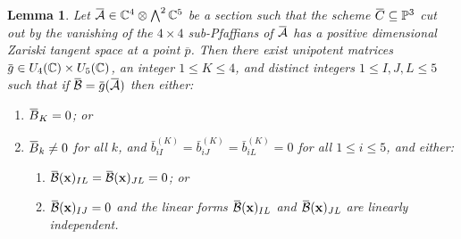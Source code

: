 \documentclass[11pt]{amsart}
\numberwithin{theorem}{section}
\numberwithin{equation}{section}
\newtheorem{lemma}[theorem]{Lemma}
\theoremstyle{definition}\newtheorem{defn}[theorem]{Definition}
\theoremstyle{definition}\newtheorem{remark}[theorem]{Remark}
\theoremstyle{definition}\newtheorem{question}[theorem]{Question}
\theoremstyle{definition}\newtheorem{problem}[theorem]{Problem}
\newcommand{\CC}{\mathbb{C}}
\newcommand{\PP}{\mathbb{P}}
\newcommand{\cB}{\mathcal{B}}
\newcommand{\cA}{\mathcal{A}}
\newcommand{\overbar}[1]{\mkern 1.5mu\overline{\mkern-1.5mu#1\mkern-1.5mu}\mkern 1.5mu}
\renewcommand{\subset}{\subseteq}
\newcommand{\I}{I}
\newcommand{\J}{J}
\newcommand{\K}{K}
\renewcommand{\L}{L}
\begin{document}
\begin{lemma}
    \label{lemma:normal-form-5-CC}
       Let $\overbar{\cA} \in \CC^4 \otimes \bigwedge^2 \CC^5$ be a section such that the scheme $\overbar{C} \subset \PP^3$ cut out by the vanishing of the $4 \times 4$ sub-Pfaffians of $\overbar{\cA}$ has a positive dimensional Zariski tangent space at a point $\overline{p}$. Then there exist unipotent matrices $\overbar{g} \in U_4(\CC) \times U_5(\CC)$, an integer $1 \leq \K \leq 4$, and distinct integers $1 \leq \I,\J,\L \leq 5$ such that if $\overbar \cB = \overbar{g}(\overbar \cA)$ then either:
       \begin{enumerate}[label=(\Alph*)]
           \item \label{norm-form-CC-1} $\overbar{B}_\K = 0$; or
           \item \label{norm-form-CC-2} $\overbar{B}_{k} \neq 0$ for all $k$, and $\bar{b}_{i \I}^{(\K)} = \bar{b}_{i \J}^{(\K)} = \bar{b}_{i \L}^{(\K)} = 0$ for all $1 \leq i \leq 5$, and either:
             \begin{enumerate}[label=(\roman*)]
             \item \label{norm-form-CC-3}
               $\overbar{\mathcal{B}}(\mathbf{x})_{\I\L} = \overbar{\mathcal{B}}(\mathbf{x})_{\J\L} = 0$; or
             \item \label{norm-form-CC-4}
               $\overbar{\mathcal{B}}(\mathbf{x})_{\I\J} = 0$ and the linear forms $\overbar{\mathcal{B}}(\mathbf{x})_{\I\L}$ and $\overbar{\mathcal{B}}(\mathbf{x})_{\J\L}$ are linearly independent.
             \end{enumerate}
        \end{enumerate}
\end{lemma}
\end{document}
